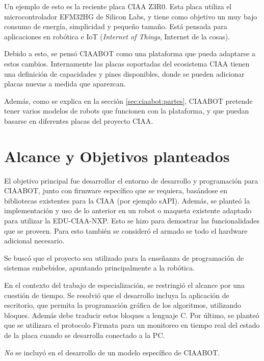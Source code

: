 Un ejemplo de esto es la reciente placa CIAA Z3R0. Esta placa utiliza el microcontrolador EFM32HG de Silicon Labs, y tiene como objetivo un muy bajo consumo de energía, simplicidad y pequeño tamaño. Está pensada para aplicaciones en robótica e IoT (\emph{Internet of Things}, Internet de la cosas).

Debido a esto, se pensó CIAABOT como una plataforma que pueda adaptarse a estos cambios. Internamente las placas soportadas del ecosistema CIAA tienen una definición de capacidades y pines disponibles, donde se pueden adicionar placas nuevas a medida que aparezcan.

Además, como se explica en la sección \ref{sec:ciaabot:partes}, CIAABOT pretende tener varios modelos de robots que funcionen con la plataforma, y que puedan basarse en diferentes placas del proyecto CIAA.

\section{Alcance y Objetivos planteados}
\label{sec:alcance}
El objetivo principal fue desarrollar el entorno de desarrollo y programación para CIAABOT, junto con firmware específico que se requiera, basándose en bibliotecas existentes para la CIAA (por ejemplo sAPI). Además, se planteó la implementación y uso de lo anterior en un robot o maqueta existente adaptado para utilizar la EDU-CIAA-NXP. Esto se hizo para demostrar las funcionalidades que se proveen. Para esto también se consideró el armado se todo el hardware adicional necesario.

Se buscó que el proyecto sea utilizado para la enseñanza de programación de sistemas embebidos, apuntando principalmente a la robótica.

En el contexto del trabajo de especialización, se restringió el alcance por una cuestión de tiempo. Se resolvió que el desarrollo incluya la aplicación de escritorio, que permita la programación gráfica de los algoritmos, utilizando bloques. Además debe traducir estos bloques a lenguaje C. Por último, se planteó que se utilizara el protocolo Firmata para un monitoreo en tiempo real del estado de la placa cuando se desarrolla conectado a la PC.

\emph{No} se incluyó en el desarrollo de un modelo específico de CIAABOT.
